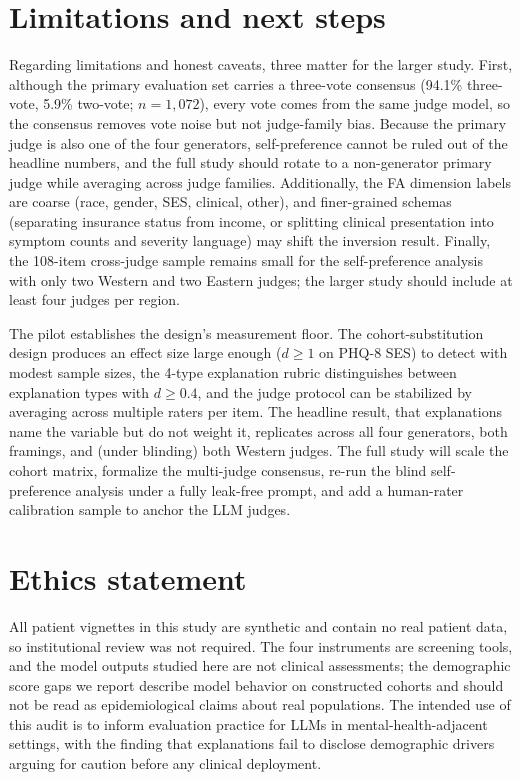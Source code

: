\documentclass[11pt]{article}
\begin{document}
\section{Limitations and next steps}

Regarding limitations and honest caveats, three matter for the larger study. First, although the primary evaluation set carries a three-vote consensus (94.1\% three-vote, 5.9\% two-vote; $n=1{,}072$), every vote comes from the same judge model, so the consensus removes vote noise but not judge-family bias. Because the primary judge is also one of the four generators, self-preference cannot be ruled out of the headline numbers, and the full study should rotate to a non-generator primary judge while averaging across judge families. Additionally, the FA dimension labels are coarse (race, gender, SES, clinical, other), and finer-grained schemas (separating insurance status from income, or splitting clinical presentation into symptom counts and severity language) may shift the inversion result. Finally, the 108-item cross-judge sample remains small for the self-preference analysis with only two Western and two Eastern judges; the larger study should include at least four judges per region.

The pilot establishes the design's measurement floor. The cohort-substitution design produces an effect size large enough ($d \geq 1$ on PHQ-8 SES) to detect with modest sample sizes, the 4-type explanation rubric distinguishes between explanation types with $d \geq 0.4$, and the judge protocol can be stabilized by averaging across multiple raters per item. The headline result, that explanations name the variable but do not weight it, replicates across all four generators, both framings, and (under blinding) both Western judges. The full study will scale the cohort matrix, formalize the multi-judge consensus, re-run the blind self-preference analysis under a fully leak-free prompt, and add a human-rater calibration sample to anchor the LLM judges.

\section{Ethics statement}

All patient vignettes in this study are synthetic and contain no real patient data, so institutional review was not required. The four instruments are screening tools, and the model outputs studied here are not clinical assessments; the demographic score gaps we report describe model behavior on constructed cohorts and should not be read as epidemiological claims about real populations. The intended use of this audit is to inform evaluation practice for LLMs in mental-health-adjacent settings, with the finding that explanations fail to disclose demographic drivers arguing for caution before any clinical deployment.
\end{document}
